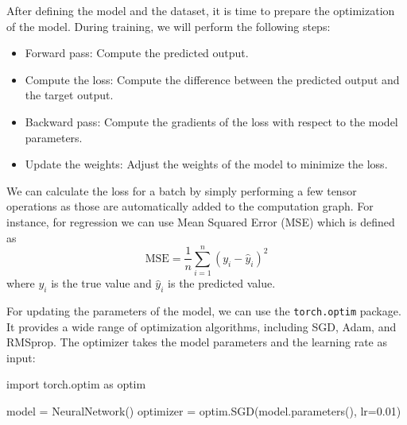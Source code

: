 After defining the model and the dataset, it is time to prepare the optimization of the model. During
training, we will perform the following steps:

\begin{itemize}
    \item Forward pass: Compute the predicted output.
    \item Compute the loss: Compute the difference between the predicted output and the target output.
    \item Backward pass: Compute the gradients of the loss with respect to the model parameters.
    \item Update the weights: Adjust the weights of the model to minimize the loss.
\end{itemize}

We can calculate the loss for a batch by simply performing a few tensor operations as those are
automatically added to the computation graph. For instance, for regression we can use Mean
Squared Error (MSE) which is defined as
\[
\text{MSE} = \frac{1}{n}\sum_{i=1}^{n}(y_i - \hat{y}_i)^2
\]
where $y_i$ is the true value and $\hat{y}_i$ is the predicted value.

For updating the parameters of the model, we can use the \texttt{torch.optim} package. It provides a
wide range of optimization algorithms, including SGD, Adam, and RMSprop. The optimizer takes the model parameters and the learning rate as input:

\begin{codeblock}[language=python]
    import torch.optim as optim

    model = NeuralNetwork()
    optimizer = optim.SGD(model.parameters(), lr=0.01)
\end{codeblock}

